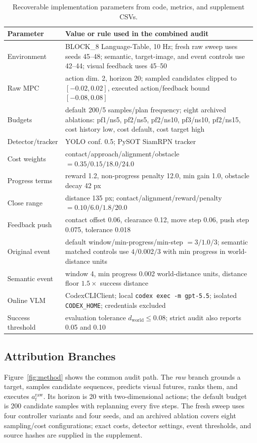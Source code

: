 \documentclass[conference]{IEEEtran}
\newcommand{\distw}{d_{\mathrm{world}}}
\begin{document}
\begin{table}[!t]
\centering
\caption{Recoverable implementation parameters from code, metrics, and supplement CSVs.}
\label{tab:methodparams}
\scriptsize
\renewcommand{\arraystretch}{0.80}
\begin{tabular}{@{}p{}@{\hspace{3pt}}p{}@{}}
\toprule
Parameter & Value or rule used in the combined audit \\
\midrule
Environment & BLOCK\_8 Language-Table, 10 Hz; fresh raw sweep uses seeds 45--48; semantic, target-image, and event controls use 42--44; visual feedback uses 45--50 \\
Raw MPC & action dim. 2, horizon 20; sampled candidates clipped to $[-0.02,0.02]$, executed action/feedback bound $[-0.08,0.08]$ \\
Budgets & default 200/5 samples/plan frequency; eight archived ablations: pf1/ns5, pf2/ns5, pf2/ns10, pf3/ns10, pf2/ns15, cost history low, cost default, cost target high \\
Detector/tracker & YOLO conf. 0.5; PySOT SiamRPN tracker \\
Cost weights & contact/approach/alignment/obstacle $=0.35/0.15/18.0/24.0$ \\
Progress terms & reward 1.2, non-progress penalty 12.0, min gain 1.0, obstacle decay 42 px \\
Close range & distance 135 px; contact/alignment/reward/penalty $=0.10/6.0/1.8/20.0$ \\
Feedback push & contact offset 0.06, clearance 0.12, move step 0.06, push step 0.075, tolerance 0.018 \\
Original event & default window/min-progress/min-step $=3/1.0/3$; semantic matched controls use $4/0.002/3$ with min progress in world-distance units \\
Semantic event & window 4, min progress 0.002 world-distance units, distance floor $1.5\times$ success distance \\
Online VLM & CodexCLIClient; local \texttt{codex exec -m gpt-5.5}; isolated \texttt{CODEX\_HOME}; credentials excluded \\
Success threshold & evaluation tolerance $\distw\leq0.08$; strict audit also reports 0.05 and 0.10 \\
\bottomrule
\end{tabular}
\renewcommand{\arraystretch}{1.0}
\end{table}

\subsection{Attribution Branches}
Figure~\ref{fig:method} shows the common audit path. The \emph{raw} branch grounds a target, samples candidate sequences, predicts visual futures, ranks them, and executes $a_t^{\mathrm{raw}}$. Its horizon is 20 with two-dimensional actions; the default budget is 200 candidate samples with replanning every five steps. The fresh sweep uses four controller variants and four seeds, and an archived ablation covers eight sampling/cost configurations; exact costs, detector settings, event thresholds, and source hashes are supplied in the supplement.
\end{document}

